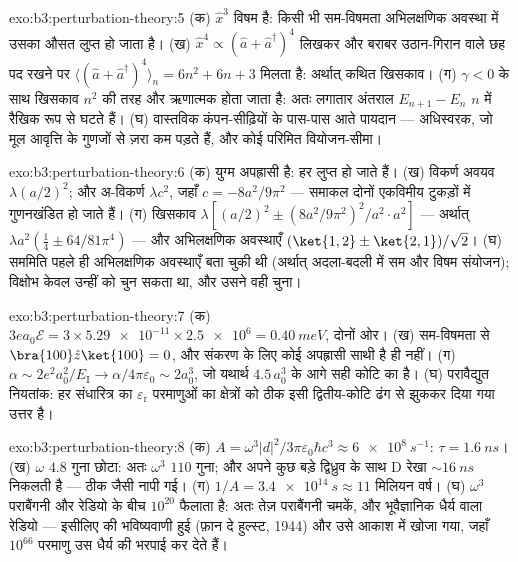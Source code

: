 \begin{solution}{exo:b3:perturbation-theory:5}
(क) $\hat x^3$ विषम है: किसी भी सम-विषमता अभिलक्षणिक अवस्था में उसका
औसत लुप्त हो जाता है। (ख) $\hat x^4 \propto (\hat a + \hat
a^\dagger)^4$ लिखकर और बराबर उठान-गिरान वाले छह पद रखने पर
$\langle(\hat a + \hat a^\dagger)^4\rangle_n = 6n^2
+ 6n + 3$ मिलता है: अर्थात् कथित खिसकाव। (ग) $\gamma < 0$ के साथ
खिसकाव $n^2$ की तरह और ऋणात्मक होता जाता है: अतः लगातार अंतराल
$E_{n+1} - E_n$ $n$ में रैखिक रूप से घटते हैं। (घ) वास्तविक कंपन-सीढ़ियों
के पास-पास आते पायदान --- अधिस्वरक, जो मूल आवृत्ति के गुणजों से ज़रा कम
पड़ते हैं, और कोई परिमित वियोजन-सीमा।
\end{solution}

\begin{solution}{exo:b3:perturbation-theory:6}
(क) युग्म अपह्रासी है: हर लुप्त हो जाते हैं। (ख) विकर्ण
अवयव $\lambda(a/2)^2$; और अ-विकर्ण $\lambda c^2$, जहाँ $c =
-8a^2/9\pi^2$ --- समाकल दोनों एकविमीय टुकड़ों में
गुणनखंडित हो जाते हैं। (ग) खिसकाव $\lambda[(a/2)^2 \pm
(8a^2/9\pi^2)^2/a^2\cdot a^2]$ --- अर्थात् $\lambda a^2(\tfrac14 \pm
64/81\pi^4)$ --- और अभिलक्षणिक अवस्थाएँ $(\ket{1,2} \pm \ket{2,1})/
\sqrt2$। (घ) सममिति पहले ही अभिलक्षणिक अवस्थाएँ बता चुकी थी (अर्थात्
अदला-बदली में सम और विषम संयोजन); विक्षोभ केवल उन्हीं को चुन सकता था,
और उसने वही चुना।
\end{solution}

\begin{solution}{exo:b3:perturbation-theory:7}
(क) $3ea_0\mathcal E = 3 \times \num{5.29e-11} \times \num{2.5e6}
= \qty{0.40}{meV}$, दोनों ओर। (ख) सम-विषमता से $\bra{100}\hat z\ket{100} = 0$,
और संकरण के लिए कोई अपह्रासी साथी है ही नहीं। (ग)
$\alpha \sim 2e^2a_0^2/E_{\text{I}} \to \alpha/4\pi\varepsilon_0
\sim 2a_0^3$, जो यथार्थ $4.5\,a_0^3$ के आगे सही कोटि का है। (घ)
परावैद्युत नियतांक: हर संधारित्र का $\varepsilon_{\text{r}}$
परमाणुओं का क्षेत्रों को ठीक इसी द्वितीय-कोटि ढंग से झुककर दिया गया उत्तर है।
\end{solution}

\begin{solution}{exo:b3:perturbation-theory:8}
(क) $A = \omega^3|d|^2/3\pi\varepsilon_0\hbar c^3 \approx
\qty{6e8}{s^{-1}}$: $\tau = \qty{1.6}{ns}$। (ख) $\omega$
$4.8$ गुना छोटा: अतः $\omega^3$ $110$ गुना; और अपने कुछ बड़े द्विध्रुव
के साथ D रेखा $\sim\qty{16}{ns}$ निकलती है --- ठीक जैसी नापी गई। (ग)
$1/A = \qty{3.4e14}{s} \approx 11$ मिलियन वर्ष। (घ) $\omega^3$
पराबैंगनी और रेडियो के बीच $10^{20}$ फैलाता है: अतः तेज़ पराबैंगनी
चमकें, और भूवैज्ञानिक धैर्य वाला रेडियो --- इसीलिए  की
भविष्यवाणी हुई (फ़ान दे हुल्स्ट, 1944) और उसे आकाश में खोजा गया, जहाँ
$10^{66}$ परमाणु उस धैर्य की भरपाई कर देते हैं।
\end{solution}

